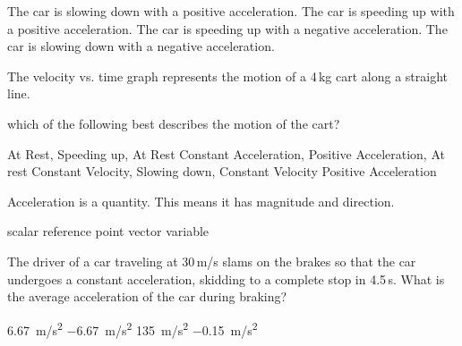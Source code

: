 \documentclass[../main-physics-problems.tex]{subfiles}
\begin{document}
\begin{questions}
\begin{randomizechoices}
    \choice The car is slowing down with a positive acceleration.
    \choice The car is speeding up with a positive acceleration.
    \choice The car is speeding up with a negative acceleration.
    \correctchoice The car is slowing down with a negative acceleration.
\end{randomizechoices}

\question
The velocity vs. time graph represents the motion of a 4\,kg cart along a straight line.

\begin{center}
\end{center}

which of the following best describes the motion of the cart?

\begin{randomizechoices}
    \choice At Rest, Speeding up, At Rest
    \choice Constant Acceleration, Positive Acceleration, At rest
    \correctchoice Constant Velocity, Slowing down, Constant Velocity
    \choice Positive Acceleration
\end{randomizechoices}

\question
Acceleration is a \fillin[vector][3cm] quantity.  This means it has magnitude and direction.

\begin{randomizechoices}
    \choice scalar
    \choice reference point
    \correctchoice vector
    \choice variable
\end{randomizechoices}

\question
The driver of a car traveling at 30\,m/s slams on the brakes so that the car undergoes a constant acceleration, skidding to a complete stop in 4.5\,s. What is the average acceleration of the car during braking?

\begin{randomizechoices}
    \choice \SI{6.67}{m/s^2}
    \correctchoice \SI{-6.67}{m/s^2}
    \choice \SI{135}{m/s^2}
    \choice \SI{-0.15}{m/s^2}
\end{randomizechoices}


\end{questions}
\end{document}
